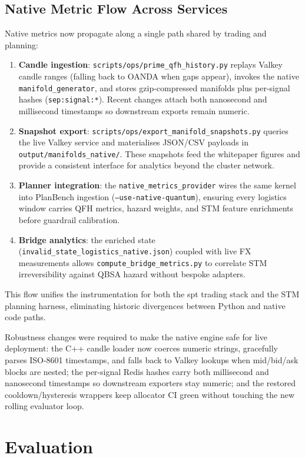 \documentclass[11pt]{article}
\begin{document}
\subsection{Native Metric Flow Across Services}
Native metrics now propagate along a single path shared by trading and planning:
\begin{enumerate}
  \item \textbf{Candle ingestion}: \texttt{scripts/ops/prime\_qfh\_history.py} replays Valkey candle ranges (falling back to OANDA when gaps appear), invokes the native \texttt{manifold\_generator}, and stores gzip-compressed manifolds plus per-signal hashes (\texttt{sep:signal:*}). Recent changes attach both nanosecond and millisecond timestamps so downstream exports remain numeric.
  \item \textbf{Snapshot export}: \texttt{scripts/ops/export\_manifold\_snapshots.py} queries the live Valkey service and materialises JSON/CSV payloads in \texttt{output/manifolds\_native/}. These snapshots feed the whitepaper figures and provide a consistent interface for analytics beyond the cluster network.
  \item \textbf{Planner integration}: the \texttt{native\_metrics\_provider} wires the same kernel into PlanBench ingestion (\texttt{--use-native-quantum}), ensuring every logistics window carries QFH metrics, hazard weights, and STM feature enrichments before guardrail calibration.
  \item \textbf{Bridge analytics}: the enriched state (\texttt{invalid\_state\_logistics\_native.json}) coupled with live FX measurements allows \texttt{compute\_bridge\_metrics.py} to correlate STM irreversibility against QBSA hazard without bespoke adapters.
\end{enumerate}

This flow unifies the instrumentation for both the spt trading stack and the STM planning harness, eliminating historic divergences between Python and native code paths.

Robustness changes were required to make the native engine safe for live deployment: the C++ candle loader now coerces numeric strings, gracefully parses ISO-8601 timestamps, and falls back to Valkey lookups when mid/bid/ask blocks are nested; the per-signal Redis hashes carry both millisecond and nanosecond timestamps so downstream exporters stay numeric; and the restored cooldown/hysteresis wrappers keep allocator CI green without touching the new rolling evaluator loop.

\section{Evaluation}
\end{document}
